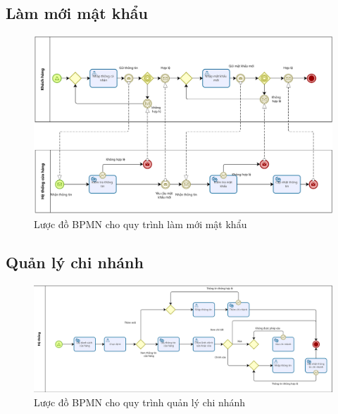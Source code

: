\subsection{Làm mới mật khẩu}
\begin{figure}[!htp]
    \centering
    \includegraphics[width=14cm]{img/BPMN/Hien/Customer_resetPassword.png}
    \newline
    \caption{Lược đồ BPMN cho quy trình làm mới mật khẩu}
\end{figure}



\subsection{Quản lý chi nhánh}
\begin{figure}[!htp]
    \centering
    \includegraphics[width=14cm]{img/BPMN/Hien/Branch_management.png}
    \newline
    \caption{Lược đồ BPMN cho quy trình quản lý chi nhánh}
\end{figure}



